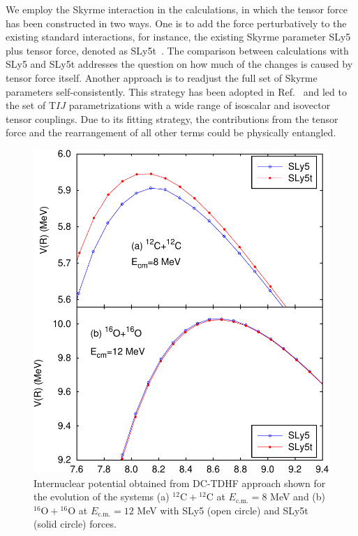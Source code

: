 We employ the Skyrme interaction in the calculations, in which the tensor force has been constructed in two ways.
One is to add the force perturbatively to the existing standard interactions, for instance,
the existing Skyrme parameter SLy5~\citep{chabanat1998a} plus tensor force, denoted as SLy5t~\citep{colo2007}.
The comparison between calculations with SLy5 and SLy5t addresses the question on how much of the changes is caused by tensor force itself.
Another approach is to readjust the full set of Skyrme parameters self-consistently.
This strategy has been adopted in Ref.~\citep{Lesinski2007_PRC76-014312} and led to
the set of T$IJ$ parametrizations with a wide range of isoscalar and isovector tensor couplings.
Due to its fitting strategy, the contributions from the tensor force and the rearrangement of all other terms could be physically entangled.
\begin{figure}
	\includegraphics[width=\textwidth]{../Figures/TensorPot/V1.pdf}
	\caption{Internuclear potential obtained from DC-TDHF approach shown for the evolution of the systems (a) $^{12}\mathrm{C}+\mathrm{^{12}C}$
		at $E_{\mathrm{c.m.}}=8$ MeV  and (b) $^{16}\mathrm{O}+\mathrm{^{16}O}$ at $E_{\mathrm{c.m.}}=12$ MeV with SLy5 (open circle) and SLy5t (solid circle) forces.
		\label{Fig:light}}
\end{figure}

